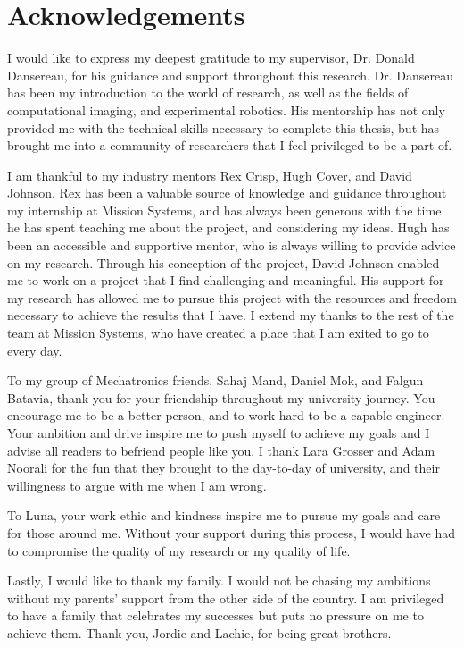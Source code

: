 \section*{Acknowledgements}
I would like to express my deepest gratitude to my supervisor, Dr. Donald 
Dansereau, for his guidance and support throughout this research. Dr. 
Dansereau has been my introduction to the world of research, as well as 
the fields of computational imaging, and experimental robotics.    
His mentorship has not only provided me with the technical skills 
necessary to complete this thesis, but has brought me into a community 
of researchers that I feel privileged to be a part of. 

I am thankful to my industry mentors Rex Crisp, Hugh Cover, and David 
Johnson. Rex has been a valuable source of knowledge and guidance throughout
my internship at Mission Systems, and has always been generous with the 
time he has spent teaching me about the project, and considering my ideas.
Hugh has been an accessible and supportive mentor, who is always willing
to provide advice on my research. Through his conception of the project,
David Johnson enabled me to work on a project that I find challenging and 
meaningful. His support for my research has allowed me to pursue this
project with the resources and freedom necessary to achieve the results that 
I have. I extend my thanks to the rest of the team at Mission Systems, who
have created a place that I am exited to go to every day. 

To my group of Mechatronics friends, Sahaj Mand, Daniel Mok, and 
Falgun Batavia, 
thank you for your friendship throughout my university journey. You 
encourage me to be a better person, and to work hard to be a capable 
engineer. Your ambition and drive inspire me to push myself to achieve
my goals and I advise all readers to befriend people like you. I 
thank Lara Grosser and Adam Noorali for  
the fun that they brought to the day-to-day of university, and their 
willingness to argue with me when I am wrong. 

To Luna, your work ethic and kindness inspire me to pursue my goals 
and care for those around me. Without your support during this process, 
I would have had to compromise the quality of my research or my quality of life.

Lastly, I would like to thank my family. I would not be chasing my 
ambitions without my parents' support from the other side of the 
country. I am privileged to have a family that celebrates my successes 
but puts no pressure on me to achieve them. Thank you, Jordie and Lachie, 
for being great brothers.